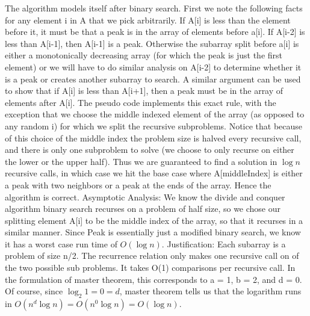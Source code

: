 \documentclass[11pt]{article}
\begin{document}
The algorithm models itself after binary search. First we note the following facts for any element i in A that we pick arbitrarily. If A[i] is less than the element before it, it must be that a peak is in the array of elements before a[i]. If A[i-2] is less than A[i-1], then A[i-1] is a peak. Otherwise the subarray split before a[i] is either a monotonically decreasing array (for which the peak is just the first element) or we will have to do similar analysis on A[i-2] to determine whether it is a peak or creates another subarray to search. A similar argument can be used to show that if A[i] is less than A[i+1], then a peak must be in the array of elements after A[i]. The pseudo code implements this exact rule, with the exception that we choose the middle indexed element of the array (as opposed to any random i) for which we split the recursive subproblems. Notice that because of this choice of the middle index the problem size is halved every recursive call, and there is only one subproblem to solve (we choose to only recurse on either the lower or the upper half). Thus we are guaranteed to find a solution in $\log n$ recursive calls, in which case we hit the base case where A[middleIndex] is either a peak with two neighbors or a peak at the ends of the array. Hence the algorithm is correct.
\newline
Asymptotic Analysis:\newline
We know the divide and conquer algorithm binary search recurses on a problem of half size, so we chose our splitting element A[i] to be the middle index of the array, so that it recurses in a similar manner. Since Peak is essentially just a modified binary search, we know it has a worst case run time of $O(\log n)$.\newline
Justification:\newline
Each subarray is a problem of size n/2. The recurrence relation only makes one recursive call on of the two possible sub problems. It takes O(1) comparisons per recursive call. In the formulation of master theorem, this corresponds to a = 1, b = 2, and d = 0. Of course, since $\log_2 1 = 0 = d$, master theorem tells us that the logarithm runs in $O(n^d \log n) = O(n^0 \log n) = O(\log n)$.



\newpage
\end{document}
